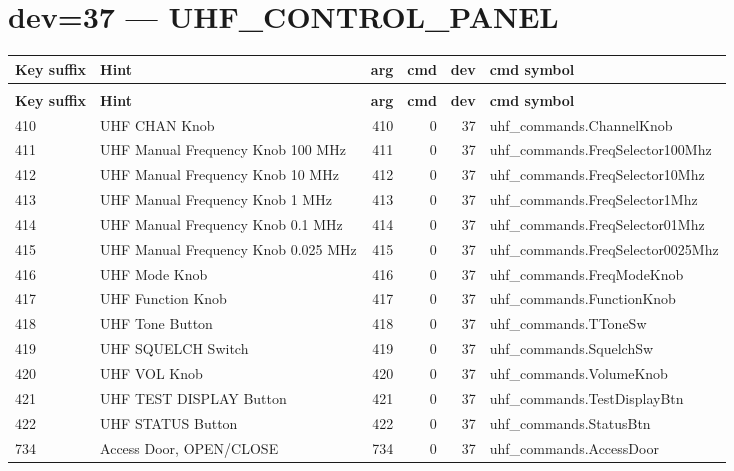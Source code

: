 \documentclass[10pt,a4paper]{article}
\begin{document}
\section{dev=37 — UHF\_CONTROL\_PANEL}
\begin{longtable}{>{\ttfamily\small}p{38mm} >{\small}p{72mm} r r r >{\ttfamily\small}p{48mm}}
\toprule
\textbf{Key suffix} & \textbf{Hint} & \textbf{arg} & \textbf{cmd} & \textbf{dev} & \textbf{cmd symbol} \\
\midrule
\endfirsthead
\multicolumn{6}{l}{\small\itshape continued\ldots}\\
\toprule
\textbf{Key suffix} & \textbf{Hint} & \textbf{arg} & \textbf{cmd} & \textbf{dev} & \textbf{cmd symbol} \\
\midrule
\endhead
\bottomrule
\endfoot
\rowcolor{rowodd}
  410 & UHF CHAN Knob & 410 & 0 & 37 & uhf\_commands.ChannelKnob \\
  411 & UHF Manual Frequency Knob 100 MHz & 411 & 0 & 37 & uhf\_commands.FreqSelector100Mhz \\
\rowcolor{rowodd}
  412 & UHF Manual Frequency Knob 10 MHz & 412 & 0 & 37 & uhf\_commands.FreqSelector10Mhz \\
  413 & UHF Manual Frequency Knob 1 MHz & 413 & 0 & 37 & uhf\_commands.FreqSelector1Mhz \\
\rowcolor{rowodd}
  414 & UHF Manual Frequency Knob 0.1 MHz & 414 & 0 & 37 & uhf\_commands.FreqSelector01Mhz \\
  415 & UHF Manual Frequency Knob 0.025 MHz & 415 & 0 & 37 & uhf\_commands.FreqSelector0025Mhz \\
\rowcolor{rowodd}
  416 & UHF Mode Knob & 416 & 0 & 37 & uhf\_commands.FreqModeKnob \\
  417 & UHF Function Knob & 417 & 0 & 37 & uhf\_commands.FunctionKnob \\
\rowcolor{rowodd}
  418 & UHF Tone Button & 418 & 0 & 37 & uhf\_commands.TToneSw \\
  419 & UHF SQUELCH Switch & 419 & 0 & 37 & uhf\_commands.SquelchSw \\
\rowcolor{rowodd}
  420 & UHF VOL Knob & 420 & 0 & 37 & uhf\_commands.VolumeKnob \\
  421 & UHF TEST DISPLAY Button & 421 & 0 & 37 & uhf\_commands.TestDisplayBtn \\
\rowcolor{rowodd}
  422 & UHF STATUS Button & 422 & 0 & 37 & uhf\_commands.StatusBtn \\
  734 & Access Door, OPEN/CLOSE & 734 & 0 & 37 & uhf\_commands.AccessDoor \\
\end{longtable}
\end{document}
